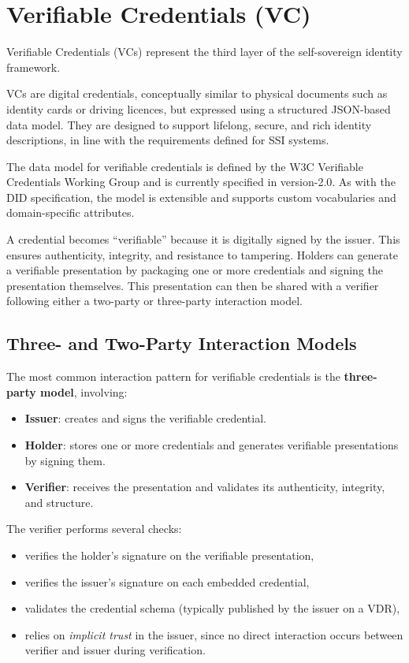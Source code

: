 \section{Verifiable Credentials (VC)}

Verifiable Credentials (VCs) represent the third layer of the self-sovereign identity framework. 
\medskip

\noindent
VCs are digital credentials, conceptually similar to physical documents such as identity cards or driving licences, but expressed using a structured JSON-based data model. They are designed to support lifelong, secure, and rich identity descriptions, in line with the requirements defined for SSI systems.
\medskip

\noindent
The data model for verifiable credentials is defined by the W3C Verifiable Credentials Working Group and is currently specified in version-2.0. As with the DID specification, the model is extensible and supports custom vocabularies and domain-specific attributes.
\medskip

\noindent
A credential becomes “verifiable” because it is digitally signed by the issuer. This ensures authenticity, integrity, and resistance to tampering. Holders can generate a verifiable presentation by packaging one or more credentials and signing the presentation themselves. 
This presentation can then be shared with a verifier following either a two-party or three-party interaction model.

\subsection {Three- and Two-Party Interaction Models}

The most common interaction pattern for verifiable credentials is the 
\textbf{three-party model}, involving:
\begin{itemize}
    \item \textbf{Issuer}: creates and signs the verifiable credential.
    \item \textbf{Holder}: stores one or more credentials and generates 
    verifiable presentations by signing them.
    \item \textbf{Verifier}: receives the presentation and validates its 
    authenticity, integrity, and structure.
\end{itemize}

\noindent
The verifier performs several checks:
\begin{itemize}
    \item verifies the holder’s signature on the verifiable presentation,
    \item verifies the issuer’s signature on each embedded credential,
    \item validates the credential schema (typically published by the issuer on a VDR),
    \item relies on \textit{implicit trust} in the issuer, since no direct 
    interaction occurs between verifier and issuer during verification.
\end{itemize}

